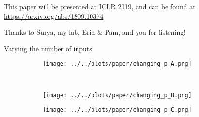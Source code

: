 \documentclass{beamer}
\begin{document}
\begin{frame}[standout]
This paper will be presented at ICLR 2019, and can be found at \url{https://arxiv.org/abs/1809.10374} \\[1em]
\end{frame}

\begin{frame}[standout]
Thanks to Surya, my lab, Erin \& Pam, and you for listening!
\end{frame}

\begin{frame}[allowframebreaks]


{}

\end{frame}

\appendix
\begin{frame}{Varying the number of inputs}
\begin{figure}[t]
\centering
\begin{subfigure}[t]{0.48\textwidth}
\texttt{[image: ../../plots/paper/changing\_p\_A.png]}
\label{supp_P_fig_A}
\end{subfigure}\\[-1em]
\begin{subfigure}[t]{0.36\textwidth}
\texttt{[image: ../../plots/paper/changing\_p\_B.png]}
\label{supp_P_fig_B}
\end{subfigure}%
\begin{subfigure}[t]{0.48\textwidth}
\texttt{[image: ../../plots/paper/changing\_p\_C.png]}
\label{supp_P_fig_C}
\end{subfigure}
\end{figure}
\end{frame}
\end{document}
